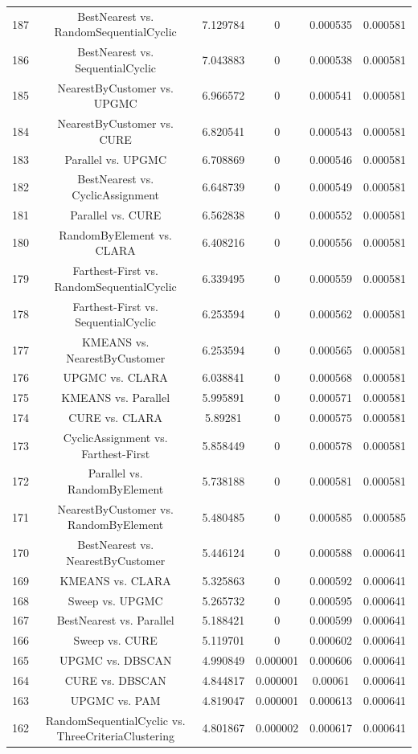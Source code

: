 \documentclass[a4paper,10pt]{article}
\begin{document}
\begin{landscape}
\begin{table}[!htp]
\begin{tabular}{cccccc}
187&BestNearest vs. RandomSequentialCyclic&7.129784&0&0.000535&0.000581\\
186&BestNearest vs. SequentialCyclic&7.043883&0&0.000538&0.000581\\
185&NearestByCustomer vs. UPGMC&6.966572&0&0.000541&0.000581\\
184&NearestByCustomer vs. CURE&6.820541&0&0.000543&0.000581\\
183&Parallel vs. UPGMC&6.708869&0&0.000546&0.000581\\
182&BestNearest vs. CyclicAssignment&6.648739&0&0.000549&0.000581\\
181&Parallel vs. CURE&6.562838&0&0.000552&0.000581\\
180&RandomByElement vs. CLARA&6.408216&0&0.000556&0.000581\\
179&Farthest-First vs. RandomSequentialCyclic&6.339495&0&0.000559&0.000581\\
178&Farthest-First vs. SequentialCyclic&6.253594&0&0.000562&0.000581\\
177&KMEANS vs. NearestByCustomer&6.253594&0&0.000565&0.000581\\
176&UPGMC vs. CLARA&6.038841&0&0.000568&0.000581\\
175&KMEANS vs. Parallel&5.995891&0&0.000571&0.000581\\
174&CURE vs. CLARA&5.89281&0&0.000575&0.000581\\
173&CyclicAssignment vs. Farthest-First&5.858449&0&0.000578&0.000581\\
172&Parallel vs. RandomByElement&5.738188&0&0.000581&0.000581\\
171&NearestByCustomer vs. RandomByElement&5.480485&0&0.000585&0.000585\\
170&BestNearest vs. NearestByCustomer&5.446124&0&0.000588&0.000641\\
169&KMEANS vs. CLARA&5.325863&0&0.000592&0.000641\\
168&Sweep vs. UPGMC&5.265732&0&0.000595&0.000641\\
167&BestNearest vs. Parallel&5.188421&0&0.000599&0.000641\\
166&Sweep vs. CURE&5.119701&0&0.000602&0.000641\\
165&UPGMC vs. DBSCAN&4.990849&0.000001&0.000606&0.000641\\
164&CURE vs. DBSCAN&4.844817&0.000001&0.00061&0.000641\\
163&UPGMC vs. PAM&4.819047&0.000001&0.000613&0.000641\\
162&RandomSequentialCyclic vs. ThreeCriteriaClustering&4.801867&0.000002&0.000617&0.000641\\

\end{tabular}
\end{table}
\end{landscape}
\end{document}
